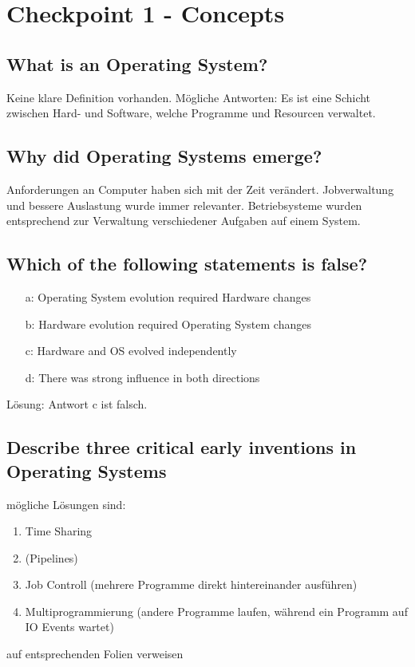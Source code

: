 \section{Checkpoint 1 - Concepts}

\addtocounter{subsection}{1}

\subsection{What is an Operating System?}
Keine klare Definition vorhanden.
Mögliche Antworten:
Es ist eine Schicht zwischen Hard- und Software, welche Programme und Resourcen verwaltet.

\subsection{Why did Operating Systems emerge?}
Anforderungen an Computer haben sich mit der Zeit verändert.
Jobverwaltung und bessere Auslastung wurde immer relevanter.
Betriebsysteme wurden entsprechend zur Verwaltung verschiedener Aufgaben auf einem System.

\subsection{Which of the following statements is false?}
\begin{enumerate}
    \item[a:] Operating System evolution required Hardware changes
    \item[b:] Hardware evolution required Operating System changes
    \item[c:] Hardware and OS evolved independently
    \item[d:] There was strong influence in both directions 
\end{enumerate}

Lösung: Antwort c ist falsch.

\subsection{Describe three critical early inventions in Operating Systems}
mögliche Lösungen sind:
\begin{enumerate}
    \item Time Sharing
    \item (Pipelines)
    \item Job Controll (mehrere Programme direkt hintereinander ausführen)
    \item Multiprogrammierung (andere Programme laufen, während ein Programm auf IO Events wartet)
\end{enumerate}
\todo auf entsprechenden Folien verweisen

